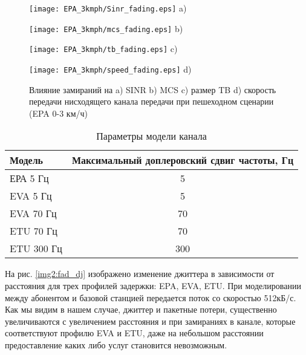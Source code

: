 \begin{figure} [!h]
\begin{minipage}[h]{0.47\linewidth}
\center
\texttt{[image: EPA\_3kmph/Sinr\_fading.eps]} a) \\
\end{minipage}
\hfill
\begin{minipage}[h]{0.47\linewidth}
\center
\texttt{[image: EPA\_3kmph/mcs\_fading.eps]} b) \\
\end{minipage}
\vfill
\begin{minipage}[h]{0.47\linewidth}
\center
\texttt{[image: EPA\_3kmph/tb\_fading.eps]} c) \\
\end{minipage}
\hfill
\begin{minipage}[h]{0.47\linewidth}
\center
\texttt{[image: EPA\_3kmph/speed\_fading.eps]} d) \\
\end{minipage}
\caption{Влияние замираний на a) SINR b) MCS c) размер TB d) скорость передачи нисходящего канала передачи при пешеходном сценарии (EPA 0-3 км/ч)}
\label{img:EPA_3kmph}
\end{figure}


\begin{table} [!htb]
  \centering
\parbox{15cm}{\caption{Параметры модели канала \cite{iks}}\label{model_chanel}}
\begin{tabular}{|l|c|}
    \hline
    \hline
    Модель     & Максимальный доплеровский сдвиг частоты, Гц \\ \hline \hline
    ЕРА 5 Гц   & 5                                       \\ \hline
    EVA 5 Гц   & 5                                       \\ \hline
    EVA 70 Гц  & 70                                      \\ \hline
    ETU 70 Гц  & 70                                      \\ \hline
    ETU 300 Гц & 300                                     \\ \hline
    \end{tabular}
\end{table}

На рис. \ref{img2:fad_dj} изображено изменение джиттера в зависимости от расстояния для трех профилей задержки: EPA, EVA, ETU. 
При моделировании между абонентом и базовой станцией передается поток со скоростью 512кБ/с. Как мы видим в нашем случае, джиттер и пакетные потери, существенно увеличиваются с увеличением расстояния и при замираниях в канале, которые соответствуют профилю EVA и ETU, даже на небольшом расстоянии предоставление каких либо услуг становится невозможным.

